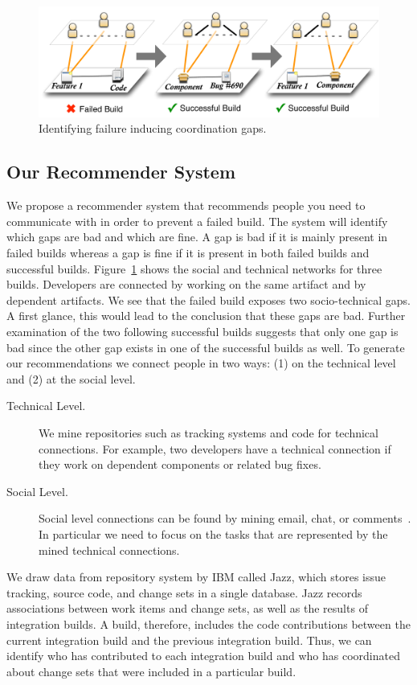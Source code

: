 \begin{figure}[t]
\centering
\includegraphics[width=0.9\columnwidth]{figures/bad-to-good}
\caption{Identifying failure inducing coordination gaps.}
\label{fig:multipleplanes}
\end{figure}

\subsection{Our Recommender System}
We propose a recommender system that recommends people you need to communicate with in order to prevent a failed build. 
The system will identify which gaps are bad and which are fine. 
A gap is bad if it is mainly present in failed builds whereas a gap is fine if it is present in both failed builds and successful builds. 
Figure~\ref{fig:multipleplanes} shows the social and technical networks for three builds. 
Developers are connected by working on the same artifact and by dependent artifacts. 
We see that the failed build exposes two socio-technical gaps. 
A first glance, this would lead to the conclusion that these gaps are bad. 
Further examination of the two following successful builds suggests that only one gap is bad since the other gap exists in one of the successful builds as well. 
To generate our recommendations we connect people in two ways: (1) on the technical level and (2) at the social level. 

\begin{description}
\item[Technical Level.] 
We mine repositories such as tracking systems and code for technical connections. 
For example, two developers have a technical connection if they work on dependent components or related bug fixes.
\item[Social Level.]
Social level connections can be found by mining email, chat, or comments~\cite{cataldo:cscw:2006}. 
In particular we need to focus on the tasks that are represented by the mined technical connections. 
\end{description}

We draw data from repository system by IBM called Jazz, which stores issue tracking, source code, and change sets in a single database. 
Jazz records associations between work items and change sets, as well as the results of integration builds. 
A build, therefore, includes the code contributions between the current integration build and the previous integration build. 
Thus, we can identify who has contributed to each integration build and who has coordinated about change sets that were included in a particular build.

